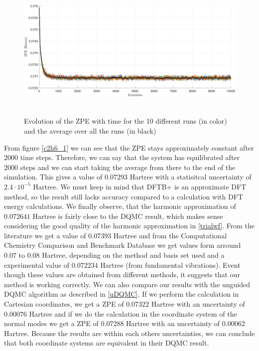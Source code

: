 \documentclass [12pt]{report}
\begin{document}
\begin{figure}[h]
\includegraphics[width=\linewidth, height=6cm] {c2h6_1.png} \label{c2h6_1}
\caption{Evolution of the ZPE with time for the 10 different runs (in color) and the average over all the runs (in black)} \label{cap_c2h6_1}
\end{figure}
From figure \ref{c2h6_1} we can see that the ZPE stays approximately constant after $2000$ time steps. Therefore, we can say that the system has equilibrated after $2000$ steps and we can start taking the average from there to the end of the simulation. This gives a value of $0.07293$ Hartree with a statisitcal uncertainty  of $2.4 \cdot 10^{-5}$ Hartree. We must keep in mind that DFTB+ is an approximate DFT method, so the result still lacks accuracy compared to a calculation with DFT energy calculations. We finally observe, that the harmonic approximation of $0.072641$ Hartree is fairly close to the DQMC result, which makes sense considering the good quality of the harmonic approximation in \ref{trialwf}. From the literature \cite{c2h6} we get a value of $0.07393$ Hartree and from the Computational Chemistry Comparison and Benchmark Database \cite{cccbdb} we get values form arround $0.07$ to $0.08$ Hartree, depending on the method and basis set used and a experimental value of $0.072234$ Hartree (from fundamental vibrations). Event though these values are obtained from different methods, it suggests that our method is working correctly.
We can also compare our results with the unguided DQMC algorithm as described in \ref{uDQMC}. If we perform the calculation in Cartesian coordinates, we get a ZPE of $0.07322$ Hartree with an uncertainty of $0.00076$ Hartree and if we do the calculation in the coordinate system of the normal modes we get a ZPE of $0.07288$ Hartree with an uncertainty of $0.00062$ Hartree. Because the results are within each others uncertainties, we can conclude that both coordinate systems are equivalent in their DQMC result.
\end{document}
